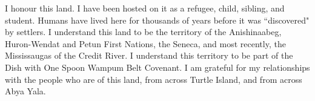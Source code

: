 I honour this land. I have been hosted on it as a refugee, child, sibling, and student. Humans have lived here for thousands of years before it was  ``discovered" by settlers. I understand this land to be the territory of the Anishinaabeg, Huron-Wendat and Petun First Nations, the Seneca, and most recently, the Mississaugas of the Credit River. I understand this territory to be part of the Dish with One Spoon Wampum Belt Covenant. I am grateful for my relationships with the people who are of this land, from across Turtle Island, and from across Abya Yala.
